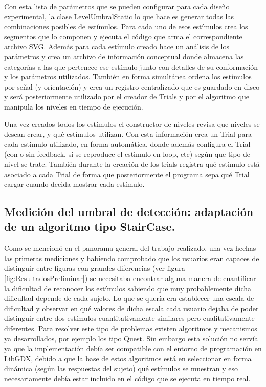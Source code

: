 \documentclass{article}
\numberwithin{figure}{section}
\begin{document}
    Con esta lista de parámetros que se pueden configurar para cada diseño experimental, la clase LevelUmbralStatic lo que hace es generar todas las combinaciones posibles de estímulos. Para cada uno de esos estímulos crea los segmentos que lo componen y ejecuta el código que arma el correspondiente archivo SVG. Además para cada estímulo creado hace un análisis de los parámetros y crea un archivo de información conceptual donde almacena las categorías a las que pertenece ese estímulo junto con detalles de su conformación y los parámetros utilizados. También en forma simultánea ordena los estímulos por señal (y orientación) y crea un registro centralizado que es guardado en disco y será posteriormente utilizado por el creador de Trials y por el algoritmo que manipula los niveles en tiempo de ejecución.
    
    Una vez creados todos los estímulos el constructor de niveles revisa que niveles se desean crear, y qué estímulos utilizan. Con esta información crea un Trial para cada estimulo utilizado, en forma automática, donde además configura el Trial (con o sin feedback, si se reproduce el estimulo en loop, etc) según que tipo de nivel se trate. También durante la creación de los trials registra qué estimulo está asociado a cada Trial de forma que posteriormente el programa sepa qué Trial cargar cuando decida mostrar cada estímulo. 
    
    \subsection{Medición del umbral de detección: adaptación de un algoritmo tipo StairCase.}
    \label{seccion:staircase}
    
    Como se mencionó en el panorama general del trabajo realizado, una vez hechas las primeras mediciones y habiendo comprobado que los usuarios eran capaces de distinguir entre figuras con grandes diferencias (ver figura \ref{fig:ResultadosPreliminar}) se necesitaba encontrar alguna manera de cuantificar la dificultad de reconocer los estímulos sabiendo que muy probablemente dicha dificultad depende de cada sujeto. Lo que se quería era establecer una escala de dificultad y observar en qué valores de dicha escala cada usuario dejaba de poder distinguir entre dos estímulos cuantitativamente similares pero cualitativamente diferentes. Para resolver este tipo de problemas existen algoritmos y mecanismos ya desarrollados, por ejemplo los tipo Quest. Sin embargo esta solución no servía ya que la implementación debía ser compatible con el entorno de programación en LibGDX, debido a que la base de estos algoritmos está en seleccionar en forma dinámica (según las respuestas del sujeto) qué estímulos se muestran y eso necesariamente debía estar incluido en el código que se ejecuta en tiempo real. 
    
\end{document}
